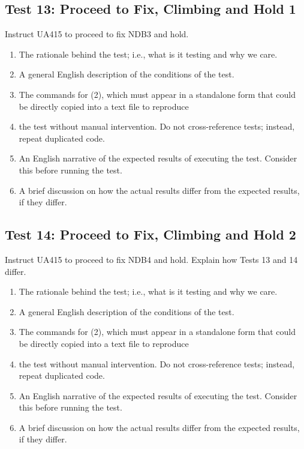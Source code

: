 \documentclass[letterpaper, 12pt]{article}
\begin{document}
\subsection{Test 13: Proceed to Fix, Climbing and Hold 1}
Instruct UA415 to proceed to fix NDB3 and hold.
\begin{enumerate}
\item The rationale behind the test; i.e., what is it testing and why we care.
\item A general English description of the conditions of the test.
\item The commands for (2), which must appear in a standalone form that could be directly copied into a text file to reproduce
\item the test without manual intervention. Do not cross-reference tests; instead, repeat duplicated code.
\item An English narrative of the expected results of executing the test. Consider this before running the test.
\item A brief discussion on how the actual results differ from the expected results, if they differ.
\end{enumerate}

\subsection{Test 14: Proceed to Fix, Climbing and Hold 2}
Instruct UA415 to proceed to fix NDB4 and hold.
Explain how Tests 13 and 14 differ.
\begin{enumerate}
\item The rationale behind the test; i.e., what is it testing and why we care.
\item A general English description of the conditions of the test.
\item The commands for (2), which must appear in a standalone form that could be directly copied into a text file to reproduce
\item the test without manual intervention. Do not cross-reference tests; instead, repeat duplicated code.
\item An English narrative of the expected results of executing the test. Consider this before running the test.
\item A brief discussion on how the actual results differ from the expected results, if they differ.
\end{enumerate}
\end{document}
